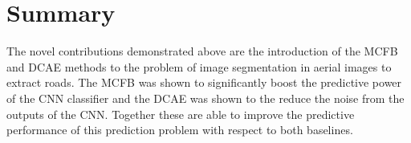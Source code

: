 \documentclass[10pt,conference,compsocconf]{IEEEtran}
\begin{document}
\section{Summary}

The novel contributions demonstrated above are the introduction of the MCFB and DCAE methods to the problem of image segmentation in aerial images to extract roads. The MCFB was shown to significantly boost the predictive power of the CNN classifier and the DCAE was shown to the reduce the noise from the outputs of the CNN. Together these are able to improve the predictive performance of this prediction problem with respect to both baselines.\\



\end{document}
